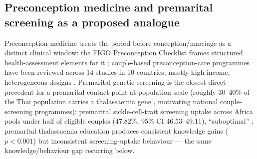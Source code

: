 \subsection{Preconception medicine and premarital screening as a proposed analogue}
Preconception medicine treats the period before conception/marriage as a distinct clinical window: the FIGO Preconception Checklist frames structured health-assessment elements for it \cite{ref11}; couple-based preconception-care programmes have been reviewed across 14 studies in 10 countries, mostly high-income, heterogeneous designs \cite{ref32}. Premarital genetic screening is the closest direct precedent for a premarital contact point at population scale (roughly 30--40\% of the Thai population carries a thalassaemia gene \cite{ref117}, motivating national couple-screening programmes): premarital sickle-cell-trait screening uptake across Africa pools under half of eligible couples (47.82\%, 95\% CI 46.53--49.11), ``suboptimal'' \cite{ref12}; premarital thalassaemia education produces consistent knowledge gains ($p<0.001$) but inconsistent screening-uptake behaviour \cite{ref13} --- the same knowledge/behaviour gap recurring below.

